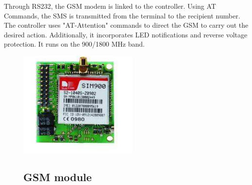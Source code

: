 \documentclass{wsdcr}
\begin{document}
Through RS232, the GSM modem is linked to the controller. Using AT Commands, the SMS is transmitted from the terminal to the recipient number. The controller uses "AT-Attention" commands to direct the GSM to carry out the desired action. Additionally, it incorporates LED notifications and reverse voltage protection. It runs on the 900/1800 MHz band.
\begin{figure}[t!]
    \centering
    \includegraphics[width=.9\linewidth]{gsm.png}
    \caption{ }
\subsection{ GSM module }
    \label{fig:example}
\end{figure}
\end{document}

